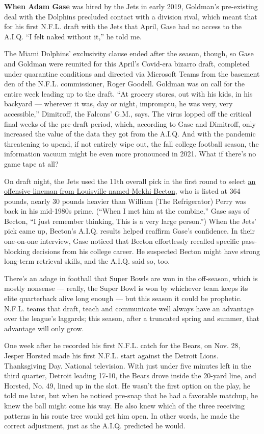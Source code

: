 \textbf{When Adam Gase} was hired by the Jets in early 2019, Goldman's
pre-existing deal with the Dolphins precluded contact with a division
rival, which meant that for his first N.F.L. draft with the Jets that
April, Gase had no access to the A.I.Q. ``I felt naked without it,'' he
told me.

The Miami Dolphins' exclusivity clause ended after the season, though,
so Gase and Goldman were reunited for this April's Covid-era bizarro
draft, completed under quarantine conditions and directed via Microsoft
Teams from the basement den of the N.F.L. commissioner, Roger Goodell.
Goldman was on call for the entire week leading up to the draft. ``At
grocery stores, out with his kids, in his backyard --- wherever it was,
day or night, impromptu, he was very, very accessible,'' Dimitroff, the
Falcons' G.M., says. The virus lopped off the critical final weeks of
the pre-draft period, which, according to Gase and Dimitroff, only
increased the value of the data they got from the A.I.Q. And with the
pandemic threatening to upend, if not entirely wipe out, the fall
college football season, the information vacuum might be even more
pronounced in 2021. What if there's no game tape at all?

On draft night, the Jets used the 11th overall pick in the first round
to select \href{https://www.youtube.com/watch?v=FEGDmXiKRgA}{an
offensive lineman from Louisville named Mekhi Becton}, who is listed at
364 pounds, nearly 30 pounds heavier than William (The Refrigerator)
Perry was back in his mid-1980s prime. (``When I met him at the
combine,'' Gase says of Becton, ``I just remember thinking, This is a
very large person.'') When the Jets' pick came up, Becton's A.I.Q.
results helped reaffirm Gase's confidence. In their one-on-one
interview, Gase noticed that Becton effortlessly recalled specific
pass-blocking decisions from his college career. He suspected Becton
might have strong long-term retrieval skills, and the A.I.Q. said so,
too.

There's an adage in football that Super Bowls are won in the off-season,
which is mostly nonsense --- really, the Super Bowl is won by whichever
team keeps its elite quarterback alive long enough --- but this season
it could be prophetic. N.F.L. teams that draft, teach and communicate
well always have an advantage over the league's laggards; this season,
after a truncated spring and summer, that advantage will only grow.

One week after he recorded his first N.F.L. catch for the Bears, on Nov.
28, Jesper Horsted made his first N.F.L. start against the Detroit
Lions. Thanksgiving Day. National television. With just under five
minutes left in the third quarter, Detroit leading 17-10, the Bears
drove inside the 20-yard line, and Horsted, No. 49, lined up in the
slot. He wasn't the first option on the play, he told me later, but when
he noticed pre-snap that he had a favorable matchup, he knew the ball
might come his way. He also knew which of the three receiving patterns
in his route tree would get him open. In other words, he made the
correct adjustment, just as the A.I.Q. predicted he would.

